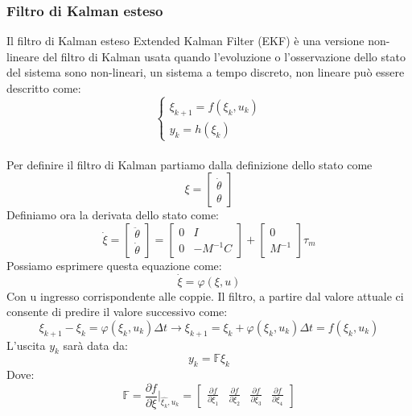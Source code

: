\subsubsection*{Filtro di Kalman esteso}
Il filtro di Kalman esteso Extended Kalman Filter (EKF) è una versione non-lineare del filtro di Kalman usata quando l'evoluzione o l'osservazione dello stato del sistema sono non-lineari, un sistema a tempo discreto, non lineare può essere descritto come:
\begin{equation}
	\begin{cases}
		\xi_{k+1} = f(\xi_k,u_k)\\
		y_k = h(\xi_k)
	\end{cases}
\end{equation}
\\Per definire il filtro di Kalman partiamo dalla definizione dello stato come
\begin{equation}
\xi = \begin{bmatrix}
\dot{\theta} \\ \theta
\end{bmatrix}
\end{equation}
Definiamo ora la derivata dello stato come:
\begin{equation}
\dot{\xi} = \begin{bmatrix}
\ddot{\theta} \\ \dot{\theta}
\end{bmatrix} =\begin{bmatrix}
0 & I \\ 0 & -M^{-1}C
\end{bmatrix} + \begin{bmatrix}
0 \\ M^{-1}
\end{bmatrix}\tau_m
\end{equation}
Possiamo esprimere questa equazione come:
\begin{equation*}
\dot{\xi} = \varphi(\xi,u)
\end{equation*}
Con u ingresso corrispondente alle coppie. Il filtro, a partire dal valore attuale ci consente di predire il valore successivo come:
\begin{equation}
\xi_{k+1} - \xi_{k} = \varphi(\xi_k,u_k)\Delta t \rightarrow \xi_{k+1} = \xi_k + \varphi(\xi_k,u_k)\Delta t = f(\xi_k,u_k)
\end{equation}
L'uscita $y_k$ sarà data da: 
\begin{equation}
y_k = \mathbb{F}\xi_k
\end{equation}
Dove:
\begin{equation*}
\mathbb{F} = \frac{\partial f}{\partial \xi} \Bigg|_{\hat{\xi_k},u_k} = \begin{bmatrix}
\frac{\partial f}{\partial \xi_1} & \frac{\partial f}{\partial \xi_2} & \frac{\partial f}{\partial \xi_3} & \frac{\partial f}{\partial \xi_4}
\end{bmatrix}
\end{equation*}
